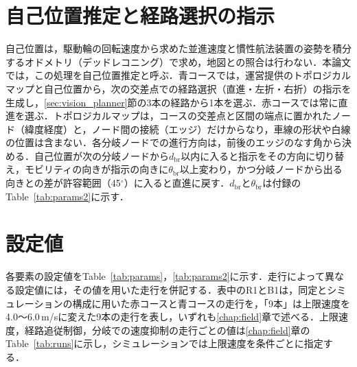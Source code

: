 \section{自己位置推定と経路選択の指示}
\label{sec:localization}
自己位置は，駆動輪の回転速度から求めた並進速度と慣性航法装置の姿勢を積分するオドメトリ（デッドレコニング）で求め，地図との照合は行わない．本論文では，この処理を自己位置推定と呼ぶ．青コースでは，運営提供のトポロジカルマップと自己位置から，次の交差点での経路選択（直進・左折・右折）の指示を生成し，\ref{sec:vision_planner}節の3本の経路から1本を選ぶ．赤コースでは常に直進を選ぶ．トポロジカルマップは，コースの交差点と区間の端点に置かれたノード（緯度経度）と，ノード間の接続（エッジ）だけからなり，車線の形状や白線の位置は含まない．各分岐ノードでの進行方向は，前後のエッジのなす角から決める．自己位置が次の分岐ノードから$d_{\mathrm{br}}$以内に入ると指示をその方向に切り替え，モビリティの向きが指示の向きに$\theta_{\mathrm{br}}$以上変わり，かつ分岐ノードから出る向きとの差が許容範囲（45$^\circ$）に入ると直進に戻す．$d_{\mathrm{br}}$と$\theta_{\mathrm{br}}$は付録のTable~\ref{tab:params2}に示す．

\section{設定値}
\label{sec:params}
各要素の設定値をTable~\ref{tab:params}，\ref{tab:params2}に示す．走行によって異なる設定値には，その値を用いた走行を併記する．表中のR1とB1は，同定とシミュレーションの構成に用いた赤コースと青コースの走行を，「9本」は上限速度を4.0〜6.0\,m/sに変えた9本の走行を表し，いずれも\ref{chap:field}章で述べる．上限速度，経路追従制御，分岐での速度抑制の走行ごとの値は\ref{chap:field}章のTable~\ref{tab:runs}に示し，シミュレーションでは上限速度を条件ごとに指定する．

